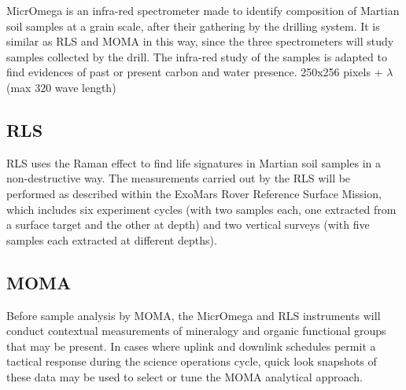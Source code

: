 \documentclass[12pt,a4paper]{article}
\begin{document}
MicrOmega is an infra-red spectrometer made to identify composition of Martian soil samples at a grain scale, after their gathering by the drilling system. It is similar as RLS and MOMA in this way, since the three spectrometers will study samples collected by the drill. The infra-red study of the samples is adapted to find evidences of past or present carbon and water presence. 
250x256 pixels + $\lambda$ (max 320 wave length)

\subsection{RLS}
RLS uses the Raman effect to find life signatures in Martian soil samples in a non-destructive way.
The measurements carried out by the RLS will be performed as described within the ExoMars Rover Reference Surface Mission, which includes six experiment cycles (with two samples each, one extracted from a surface target and the other at depth) and two vertical surveys (with five samples each extracted at different depths).
\subsection{MOMA}
Before sample analysis by MOMA, the MicrOmega and RLS instruments will conduct contextual measurements of mineralogy and organic functional groups that may be present. In cases where uplink and downlink schedules permit a tactical response during the science operations cycle, quick look snapshots of these data may be used to select or tune the MOMA analytical approach.


\pagebreak
\nocite{*}


\end{document}
